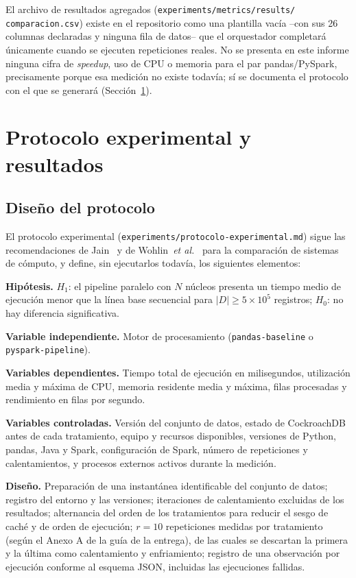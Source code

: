 \documentclass[10pt,twocolumn]{article}
\begin{document}
El archivo de resultados agregados (\texttt{experiments/metrics/results/
comparacion.csv}) existe en el repositorio como una plantilla vacía --con
sus 26 columnas declaradas y ninguna fila de datos-- que el orquestador
completará únicamente cuando se ejecuten repeticiones reales. No se
presenta en este informe ninguna cifra de \emph{speedup}, uso de CPU o
memoria para el par pandas/PySpark, precisamente porque esa medición no
existe todavía; sí se documenta el protocolo con el que se generará
(Sección~\ref{sec:protocolo}).

\section{Protocolo experimental y resultados}
\label{sec:protocolo}

\subsection{Diseño del protocolo}

El protocolo experimental (\texttt{experiments/protocolo-experimental.md})
sigue las recomendaciones de Jain~\cite{baltes2022sampling} y de
Wohlin~\emph{et al.}~\cite{verdecchia2023} para la comparación de sistemas de
cómputo, y define, sin ejecutarlos todavía, los siguientes elementos:

\textbf{Hipótesis.} $H_1$: el pipeline paralelo con $N$ núcleos presenta un
tiempo medio de ejecución menor que la línea base secuencial para
$|D| \geq 5\times10^5$ registros; $H_0$: no hay diferencia significativa.

\textbf{Variable independiente.} Motor de procesamiento
(\texttt{pandas-baseline} o \texttt{pyspark-pipeline}).

\textbf{Variables dependientes.} Tiempo total de ejecución en milisegundos,
utilización media y máxima de CPU, memoria residente media y máxima, filas
procesadas y rendimiento en filas por segundo.

\textbf{Variables controladas.} Versión del conjunto de datos, estado de
CockroachDB antes de cada tratamiento, equipo y recursos disponibles,
versiones de Python, pandas, Java y Spark, configuración de Spark, número
de repeticiones y calentamientos, y procesos externos activos durante la
medición.

\textbf{Diseño.} Preparación de una instantánea identificable del conjunto
de datos; registro del entorno y las versiones; iteraciones de calentamiento
excluidas de los resultados; alternancia del orden de los tratamientos para
reducir el sesgo de caché y de orden de ejecución; $r=10$ repeticiones
medidas por tratamiento (según el Anexo A de la guía de la entrega), de las
cuales se descartan la primera y la última como calentamiento y
enfriamiento; registro de una observación por ejecución conforme al esquema
JSON, incluidas las ejecuciones fallidas.
\end{document}
